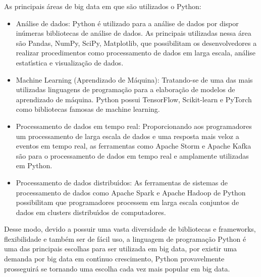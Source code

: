 As principais \'{a}reas de big data em que s\~{a}o utilizados o Python:

\begin{itemize} [itemsep=5pt, parsep=5pt]
\item An\'{a}lise de dados: Python \'{e} utilizado para a an\'{a}lise de dados por dispor in\'{u}meras bibliotecas de an\'{a}lise de dados. As principais utilizadas nessa \'{a}rea s\~{a}o Pandas, NumPy, SciPy, Matplotlib, que possibilitam os desenvolvedores a realizar procedimentos como processamento de dados em larga escala, an\'{a}lise estat\'{\i}stica e visualiza\c{c}\~{a}o de dados.

\item Machine Learning (Aprendizado de M\'{a}quina): Tratando-se de uma das mais utilizadas linguagens de programa\c{c}\~{a}o para a elabora\c{c}\~{a}o de modelos de aprendizado de m\'{a}quina. Python possui TensorFlow, Scikit-learn e PyTorch como bibliotecas famosas de machine learning.

\item Processamento de dados em tempo real: Proporcionando aos programadores um processamento de larga escala de dados e uma resposta mais veloz a eventos em tempo real, as ferramentas como Apache Storm e Apache Kafka s\~{a}o para o processamento de dados em tempo real e amplamente utilizadas em Python.

\item Processamento de dados distribu\'{\i}dos: As ferramentas de sistemas de processamento de dados como Apache Spark e Apache Hadoop de Python possibilitam que programadores processem em larga escala conjuntos de dados em clusters distribu\'{\i}dos de computadores.\newline

\end{itemize} 

Desse modo, devido a possuir uma vasta diversidade de bibliotecas e frameworks, flexibilidade e tamb\'{e}m ser de f\'{a}cil uso, a linguagem de programa\c{c}\~{a}o Python \'{e} uma das principais escolhas para ser utilizada em big data, por existir uma demanda por big data em cont\'{\i}nuo crescimento, Python provavelmente prosseguir\'{a} se tornando uma escolha cada vez mais popular em big data.
        
